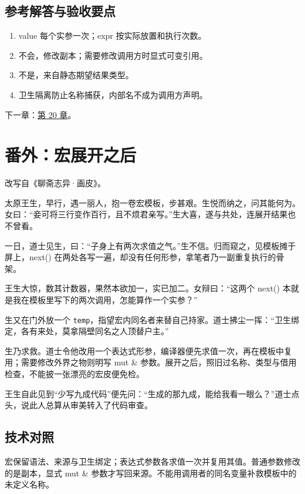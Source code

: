 \subsection*{参考解答与验收要点}

\begin{enumerate}

\item value 每个实参一次；expr 按实际放置和执行次数。

\item 不会，修改副本；需要修改调用方时显式可变引用。

\item 不是，来自静态期望结果类型。

\item 卫生隔离防止名称捕获，内部名不成为调用方声明。

\end{enumerate}

下一章：\hyperref[ch:20]{第 20 章}。

\section{番外：宏展开之后}

改写自《聊斋志异·画皮》。

太原王生，早行，遇一丽人，抱一卷宏模板，步甚艰。生悦而纳之，问其能何为。女曰：“妾可将三行变作百行，且不烦君亲写。”生大喜，遂与共处，连展开结果也不曾看。

一日，道士见生，曰：“子身上有两次求值之气。”生不信。归而窥之，见模板摊于屏上，next() 在两处各写一遍，却没有任何形参，拿笔者乃一副重复执行的骨架。

王生大惊，数其计数器，果然本欲加一，实已加二。女辩曰：“这两个 next() 本就是我在模板里写下的两次调用，怎能算作一个实参？”

生又在门外放一个 \texttt{temp}，指望宏内同名者来替自己持家。道士拂尘一挥：“卫生绑定，各有来处，莫拿隔壁同名之人顶替户主。”

生乃求救。道士令他改用一个表达式形参，编译器便先求值一次，再在模板中复用；需要修改外界之物则明写 mut \& 参数。展开之后，照旧过名称、类型与借用检查，不能披一张漂亮的宏皮便免检。

王生自此见到“少写九成代码”便先问：“生成的那九成，能给我看一眼么？”道士点头，说此人总算从审美转入了代码审查。

\subsection*{技术对照}

宏保留语法、来源与卫生绑定；表达式参数各求值一次并复用其值。普通参数修改的是副本，显式 mut \& 参数才写回来源。不能用调用者的同名变量补救模板中的未定义名称。
